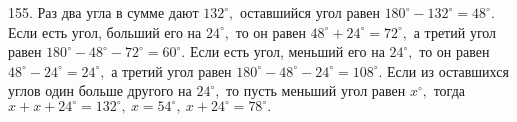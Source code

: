 155. Раз два угла в сумме дают $132^\circ,$ оставшийся угол равен $180^\circ-132^\circ=48^\circ.$ Если есть угол, больший его на $24^\circ,$ то он равен $48^\circ+24^\circ=72^\circ,$ а третий угол равен $180^\circ-48^\circ-72^\circ=60^\circ.$ Если есть угол, меньший его на $24^\circ,$ то он равен $48^\circ-24^\circ=24^\circ,$ а третий угол равен
$180^\circ-48^\circ-24^\circ=108^\circ.$ Если из оставшихся углов один больше другого на $24^\circ,$ то пусть меньший угол равен $x^\circ,$ тогда
$x+x+24^\circ=132^\circ,\ x=54^\circ,\ x+24^\circ=78^\circ.$\\
